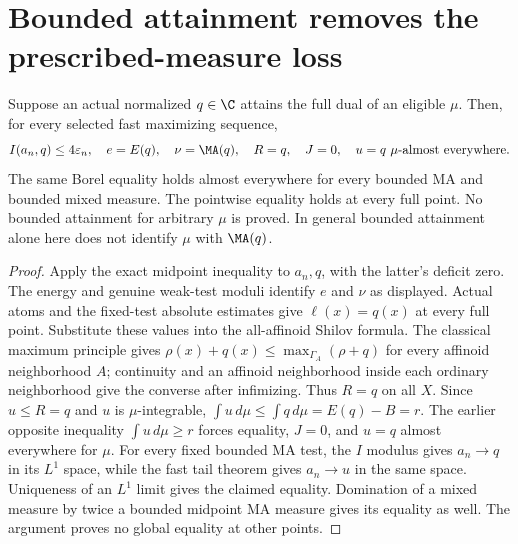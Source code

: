 \section{Bounded attainment removes the prescribed-measure loss}
\begin{theorem}\label{fresh:attainment}
Suppose an actual normalized $q\in\C$ attains the full dual of an
eligible $\mu$. Then, for every selected fast maximizing sequence,
\[
 I(a_n,q)\le4\varepsilon_n,\quad e=E(q),\quad
 \nu=\MA(q),\quad R=q,\quad J=0,
 \quad u=q\ \mu\hbox{-almost everywhere}.
\]
The same Borel equality holds almost everywhere for every bounded MA
and bounded mixed measure. The pointwise equality holds at every full
point. No bounded attainment for arbitrary $\mu$ is proved. In general
bounded attainment alone here does not identify $\mu$ with $\MA(q)$.
\end{theorem}
\begin{proof}
Apply the exact midpoint inequality to $a_n,q$, with the latter's
deficit zero. The energy and genuine weak-test moduli identify $e$
and $\nu$ as displayed. Actual atoms and the fixed-test absolute
estimates give $\ell(x)=q(x)$ at every full point. Substitute these
values into the all-affinoid Shilov formula. The classical maximum
principle gives $\rho(x)+q(x)\le\max_{\Gamma_A}(\rho+q)$ for every
affinoid neighborhood $A$; continuity and an affinoid neighborhood
inside each ordinary neighborhood give the converse after infimizing.
Thus $R=q$ on all $X$.
Since $u\le R=q$ and $u$ is $\mu$-integrable,
$\int u\,d\mu\le\int q\,d\mu=E(q)-B=r$. The earlier opposite
inequality $\int u\,d\mu\ge r$ forces equality, $J=0$, and
$u=q$ almost everywhere for $\mu$. For every fixed bounded MA test,
the $I$ modulus gives $a_n\to q$ in its $L^1$ space, while the fast
tail theorem gives $a_n\to u$ in the same space. Uniqueness of an
$L^1$ limit gives the claimed equality. Domination of a mixed measure
by twice a bounded midpoint MA measure gives its equality as well.
The argument proves no global equality at other points.
\end{proof}

